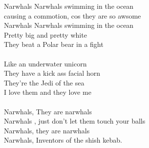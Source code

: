 \vspace{10pt}
Narwhals Narwhals swimming in the ocean\\
causing a commotion, cos they are so awsome\\
Narwhals Narwhals swimming in the ocean\\
Pretty big and pretty white \\
They beat a Polar bear in a fight\\
\\
Like an underwater unicorn\\
They have a kick ass facial horn\\
They're the Jedi of the sea\\
I love them and they love me\\
\\
Narwhals, They are narwhals\\
Narwhals , just don't let them touch your balls\\
Narwhals, they are narwhals\\
Narwhals, Inventors of the shish kebab.
